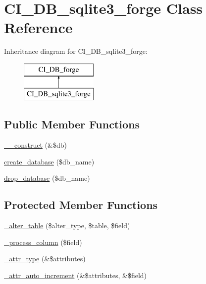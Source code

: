\hypertarget{class_c_i___d_b__sqlite3__forge}{}\section{C\+I\+\_\+\+D\+B\+\_\+sqlite3\+\_\+forge Class Reference}
\label{class_c_i___d_b__sqlite3__forge}
Inheritance diagram for C\+I\+\_\+\+D\+B\+\_\+sqlite3\+\_\+forge\+:\begin{figure}[H]
\begin{center}
\leavevmode
\includegraphics[height=2.000000cm]{class_c_i___d_b__sqlite3__forge}
\end{center}
\end{figure}
\subsection*{Public Member Functions}
\begin{DoxyCompactItemize}
\item 
\mbox{\hyperlink{class_c_i___d_b__sqlite3__forge_ae4f0df91d663be57c00fdcdef8e4c71b}{\+\_\+\+\_\+construct}} (\&\$db)
\item 
\mbox{\hyperlink{class_c_i___d_b__sqlite3__forge_a7908704e6325a9100fba94b2496e3cc9}{create\+\_\+database}} (\$db\+\_\+name)
\item 
\mbox{\hyperlink{class_c_i___d_b__sqlite3__forge_accdf0ec147800afe449b0f6c7f2b2ec0}{drop\+\_\+database}} (\$db\+\_\+name)
\end{DoxyCompactItemize}
\subsection*{Protected Member Functions}
\begin{DoxyCompactItemize}
\item 
\mbox{\hyperlink{class_c_i___d_b__sqlite3__forge_a1cf811a7cdac8a3b1203d2784da2145e}{\+\_\+alter\+\_\+table}} (\$alter\+\_\+type, \$table, \$field)
\item 
\mbox{\hyperlink{class_c_i___d_b__sqlite3__forge_aa839458e9f721b809992990a30f60042}{\+\_\+process\+\_\+column}} (\$field)
\item 
\mbox{\hyperlink{class_c_i___d_b__sqlite3__forge_a52802321e28a0eb2ddd61ef0a5845384}{\+\_\+attr\+\_\+type}} (\&\$attributes)
\item 
\mbox{\hyperlink{class_c_i___d_b__sqlite3__forge_a10da688a935580dfe70903de7caadb95}{\+\_\+attr\+\_\+auto\+\_\+increment}} (\&\$attributes, \&\$field)
\end{DoxyCompactItemize}
